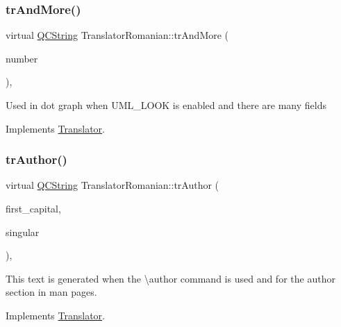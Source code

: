 \mbox{\label{class_translator_romanian_ad5066b6b53bc92b78b6f4fcd7869f7fb}} 
\subsubsection{\texorpdfstring{trAndMore()}{trAndMore()}}
{\footnotesize\ttfamily virtual \mbox{\hyperlink{class_q_c_string}{Q\+C\+String}} Translator\+Romanian\+::tr\+And\+More (\begin{DoxyParamCaption}\item[{const \mbox{\hyperlink{class_q_c_string}{Q\+C\+String}} \&}]{number }\end{DoxyParamCaption})\hspace{0.3cm}{\ttfamily [inline]}, {\ttfamily [virtual]}}

Used in dot graph when U\+M\+L\+\_\+\+L\+O\+OK is enabled and there are many fields 

Implements \mbox{\hyperlink{class_translator}{Translator}}.

\mbox{\label{class_translator_romanian_a99112a7b44c0da4a42dc73f4d663ffb4}} 
\subsubsection{\texorpdfstring{trAuthor()}{trAuthor()}}
{\footnotesize\ttfamily virtual \mbox{\hyperlink{class_q_c_string}{Q\+C\+String}} Translator\+Romanian\+::tr\+Author (\begin{DoxyParamCaption}\item[{bool}]{first\+\_\+capital,  }\item[{bool}]{singular }\end{DoxyParamCaption})\hspace{0.3cm}{\ttfamily [inline]}, {\ttfamily [virtual]}}

This text is generated when the \textbackslash{}author command is used and for the author section in man pages. 

Implements \mbox{\hyperlink{class_translator}{Translator}}.

\mbox{\label{class_translator_romanian_ac93b1de87d1f124489fb236c10744d07}} 
